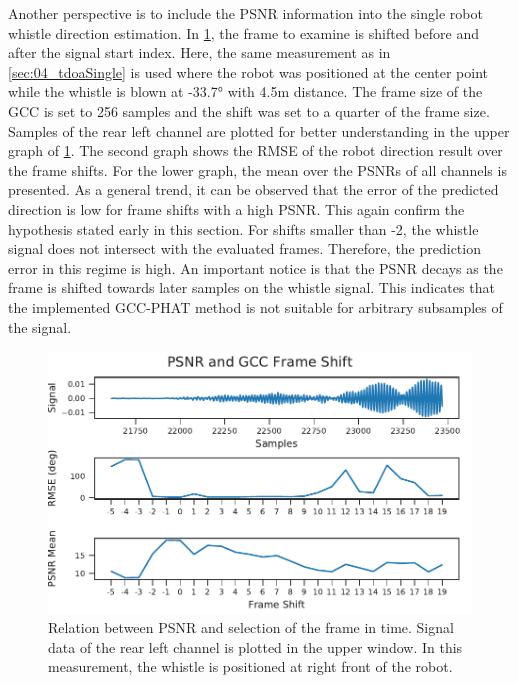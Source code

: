 Another perspective is to include the PSNR information into the single
robot whistle direction estimation.
In \cref{fig:04_psnr2FrameShift}, the frame to examine is
shifted before and after the signal start index.
Here, the same measurement as in \cref{sec:04_tdoaSingle} is used where
the robot was positioned at the center point
while the whistle is blown at -33.7\si{\degree} with 4.5\si{\meter}
distance.
The frame size of the \ac{GCC} is set to 256 samples and the shift
was set to a quarter of the frame size.
Samples of the rear left channel are plotted for better understanding
in the upper graph of \cref{fig:04_psnr2FrameShift}.
The second graph shows the \ac{RMSE} of the robot direction result
over the frame shifts.
For the lower graph, the mean over the \acp{PSNR} of all channels
is presented.
As a general trend, it can be observed that the error of the predicted
direction is low for frame shifts with a high \ac{PSNR}. This again confirm the
hypothesis stated early in this section.
For shifts smaller than -2, the whistle signal does not intersect with the
evaluated frames. Therefore, the prediction error in this regime is high.
An important notice is that the \ac{PSNR} decays as the frame is shifted towards
later samples on the whistle signal. This indicates that the implemented
\ac{GCC-PHAT} method is not suitable for arbitrary subsamples of the signal.
\begin{figure}[ht]
	\centering
	\includegraphics[]{figures/evaluation/gcc_frame_shift}
	\caption{
		Relation between \ac{PSNR}
		and selection of the frame in time. Signal data
		of the rear left channel is plotted in the upper window.
		In this measurement, the whistle is positioned at right front
		of the robot.
	}
	\label{fig:04_psnr2FrameShift}
\end{figure}

